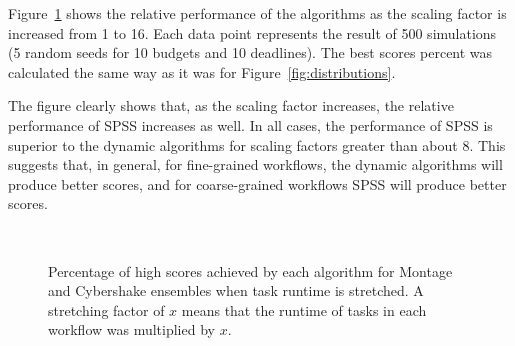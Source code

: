 \documentclass[conference]{IEEEtran}
\begin{document}
Figure~\ref{fig:stretching} shows the relative performance of the algorithms as the scaling factor is increased from 1 to 16. Each data point represents the result of 500 simulations (5 random seeds for 10 budgets and 10 deadlines). The best scores percent was calculated the same way as it was for Figure~\ref{fig:distributions}.

The figure clearly shows that, as the scaling factor increases, the relative performance of SPSS increases as well. In all cases, the performance of SPSS is superior to the dynamic algorithms for scaling factors greater than about 8. This suggests that, in general, for fine-grained workflows, the dynamic algorithms will produce better scores, and for coarse-grained workflows SPSS will produce better scores.

\begin{figure}[p]
    \centering
    \\
    \caption[Percentage of high scores achieved by each algorithm for Montage and Cybershake ensembles when task runtime is stretched]{Percentage of high scores achieved by each algorithm for Montage and Cybershake ensembles when task runtime is stretched. A stretching factor of $x$ means that the runtime of tasks in each workflow was multiplied by $x$.}
    \label{fig:stretching}
\end{figure}
\end{document}
